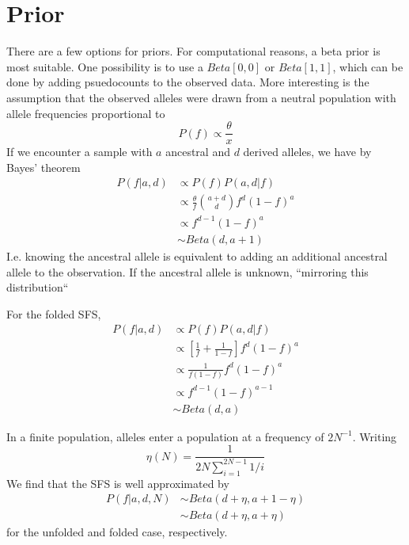 \documentclass[10pt,a4paper]{article}
\begin{document}
\section{Prior}
There are a few options for priors. For computational reasons, a beta prior is most suitable.
One possibility is to use a $Beta[0,0]$ or $Beta[1,1]$, which can be done by adding psuedocounts to the observed data.
More interesting is the assumption that the observed alleles were drawn from a neutral population with allele frequencies proportional to 
\begin{equation}
P(f) \propto \frac{\theta}{x}
\end{equation}
If we encounter a sample with $a$ ancestral and $d$ derived alleles, we have by Bayes' theorem
\begin{align}
P(f | a, d) &\propto P(f) P(a, d|f) \nonumber\\
 &\propto \frac{\theta}{f} \binom{a+d}{d} f^d (1-f)^a \nonumber\\
 &\propto f^{d-1} (1-f)^a \nonumber\\
&\sim Beta(d, a+1)
\end{align}
I.e. knowing the ancestral allele is equivalent to adding an additional ancestral allele to the observation. If the ancestral allele is unknown, ``mirroring this distribution``

For the folded SFS,
\begin{align}
P(f | a, d) &\propto P(f) P(a, d|f) \nonumber\\
&\propto \left[ \frac{1}{f} + \frac{1}{1-f}\right] f^d (1-f)^a\nonumber\\
&\propto \frac{1}{f(1-f)} f^d (1-f)^a\nonumber\\
&\propto f^{d-1} (1-f)^{a-1} \nonumber\\
&\sim Beta(d, a)
\end{align}

In a finite population, alleles enter a population at a frequency of $2N^{-1}$. Writing
$$\eta(N) = \frac{1}{2N \sum_{i=1}^{2N-1}1/i}$$
We find that the SFS is well approximated by 
\begin{align}
P(f | a, d, N) &\sim Beta(d + \eta, a+1 - \eta)\\
&\sim Beta(d + \eta, a + \eta)
\end{align}
for the unfolded and folded case, respectively.
		
\end{document}

